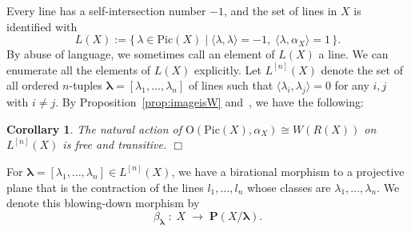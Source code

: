 \documentclass{math}
\theoremstyle{plain}
\newtheorem{corollary}[theorem]{Corollary}
\numberwithin{equation}{section}
\newcommand{\qed}{\hfill {$\Box$}}
\newcommand{\set}[2]{\{\,{#1}\mid {#2} \,\}}
\newcommand{\OG}{\mathord{\mathrm{O}}}
\newcommand{\intf}[1]{\langle #1 \rangle}
\newcommand{\Pic}{\mathrm{Pic}}
\newcommand{\blambda}{\bm{\lambda}}
\newcommand{\bP}{\bm{P}}
\begin{document}
Every line has a self-intersection number $-1$, and 
the set of lines in $X$ is identified with 
\[
L(X):=\set{\lambda\in \Pic(X)}{\intf{\lambda, \lambda}=-1,\;\intf{\lambda, \alpha_{X}}=1}.
\]
By abuse of language,
we sometimes call an element of $L(X)$ a line.
We can enumerate all the elements of $L(X)$ explicitly.
Let  $L^{[n]}(X)$ denote the set of all ordered $n$-tuples 
$\blambda=[\lambda_1, \dots, \lambda_n]$
of lines such that $\intf{\lambda_i, \lambda_j}=0$ for any $i, j$ with  $i\ne j$.
By Proposition~\ref{prop:imageisW} and~\cite[Proposition II-4]{Demazure1980},  we have the following:
%
\begin{corollary}\label{cor:freeandtransitive}
The natural action of $\OG(\Pic(X), \alpha_{X})\cong W(R(X))$ 
on $L^{[n]}(X)$ is free and transitive.
\qed
\end{corollary}
%
For $\blambda=[\lambda_1, \dots, \lambda_n]\in L^{[n]}(X)$,
we have a birational morphism
to a projective plane 
that is the contraction of the lines 
$l_1, \dots, l_n$ whose classes are $\lambda_1, \dots, \lambda_n$.
We denote this blowing-down morphism by
%
\begin{equation}\label{eq:betalambda}
\beta_{\blambda}\;\colon\; X \;\to\; \bP(X/\blambda).
\end{equation}
%
%
\end{document}
